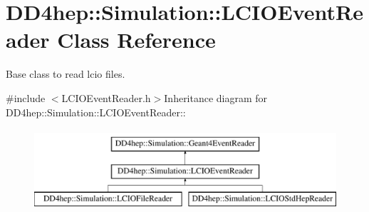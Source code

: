 \hypertarget{class_d_d4hep_1_1_simulation_1_1_l_c_i_o_event_reader}{
\section{DD4hep::Simulation::LCIOEventReader Class Reference}
\label{class_d_d4hep_1_1_simulation_1_1_l_c_i_o_event_reader}
}


Base class to read lcio files.  


{\ttfamily \#include $<$LCIOEventReader.h$>$}Inheritance diagram for DD4hep::Simulation::LCIOEventReader::\begin{figure}[H]
\begin{center}
\leavevmode
\includegraphics[height=3cm]{class_d_d4hep_1_1_simulation_1_1_l_c_i_o_event_reader}
\end{center}
\end{figure}
